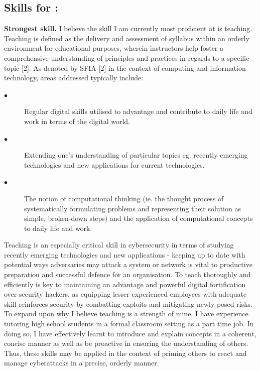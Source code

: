 \documentclass[a4paper, 11pt]{report}
\begin{document}
\subsection{Skills for \majD: \studD}

\textbf{Strongest skill.} 
\newline I believe the skill I am currently most proficient at is teaching. Teaching is defined as the delivery and assessment of syllabus within an orderly environment for educational purposes, wherein instructors help foster a comprehensive understanding of principles and practices in regards to a specific topic [2]. As denoted by SFIA [2] in the context of computing and information technology, areas addressed typically include: 
\begin{description}
\item[$\bullet$] Regular digital skills utilised to advantage and contribute to daily life and work in terms of the digital world.
\item[$\bullet$]  Extending one’s understanding of particular topics eg. recently emerging technologies and new applications for current technologies.
\item[$\bullet$]  The notion of computational thinking (ie. the thought process of systematically formulating problems and representing their solution as simple, broken-down steps) and the application of computational concepts to daily life and work.
\end{description}

Teaching is an especially critical skill in cybersecurity in terms of studying recently emerging technologies and new applications - keeping up to date with potential ways adversaries may attack a system or network is vital to productive preparation and successful defence for an organisation. To teach thoroughly and efficiently is key to maintaining an advantage and powerful digital fortification over security hackers, as equipping lesser experienced employees with adequate skill reinforces security by combatting exploits and mitigating newly posed risks. To expand upon why I believe teaching is a strength of mine, I have experience tutoring high school students in a formal classroom setting as a part time job. In doing so, I have effectively learnt to introduce and explain concepts in a coherent, concise manner as well as be proactive in ensuring the understanding of others. Thus, these skills may be applied in the context of priming others to react and manage cyberattacks in a precise, orderly manner. 
\end{document}
